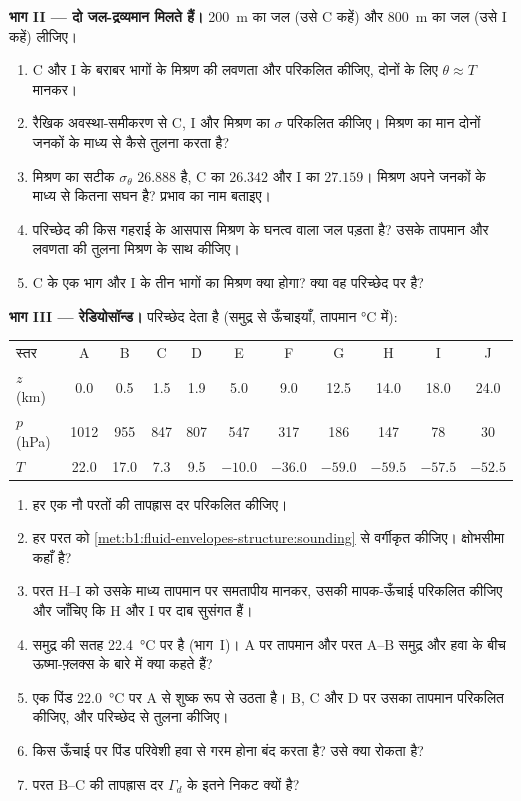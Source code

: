 \begin{problem}
\medskip
\noindent\textbf{भाग II --- दो जल-द्रव्यमान मिलते हैं।} \qty{200}{m} का जल (उसे C कहें) और \qty{800}{m} का जल (उसे I कहें) लीजिए।
\begin{enumerate}[resume]
  \item C और I के बराबर भागों के मिश्रण की लवणता और  परिकलित कीजिए, दोनों के लिए $\theta \approx T$ मानकर।
  \item रैखिक अवस्था-समीकरण से C, I और मिश्रण का $\sigma$ परिकलित कीजिए। मिश्रण का मान दोनों जनकों के माध्य से कैसे तुलना करता है?
  \item मिश्रण का सटीक $\sigma_\theta$ $26.888$ है, C का $26.342$ और I का $27.159$। मिश्रण अपने जनकों के माध्य से कितना सघन है? प्रभाव का नाम बताइए।
  \item परिच्छेद की किस गहराई के आसपास मिश्रण के घनत्व वाला जल पड़ता है? उसके तापमान और लवणता की तुलना मिश्रण के साथ कीजिए।
  \item C के एक भाग और I के तीन भागों का मिश्रण क्या होगा? क्या वह परिच्छेद पर है?
\end{enumerate}

\medskip
\noindent\textbf{भाग III --- रेडियोसॉन्ड।} परिच्छेद देता है (समुद्र से ऊँचाइयाँ, तापमान \si{\celsius} में):
\begin{center}
\small
\setlength{\tabcolsep}{4pt}
\begin{tabular}{|l|cccccccccc|}
\hline
स्तर & A & B & C & D & E & F & G & H & I & J \\
$z$ (km) & 0.0 & 0.5 & 1.5 & 1.9 & 5.0 & 9.0 & 12.5 & 14.0 & 18.0 & 24.0 \\
$p$ (hPa) & 1012 & 955 & 847 & 807 & 547 & 317 & 186 & 147 & 78 & 30 \\
$T$ & 22.0 & 17.0 & 7.3 & 9.5 & $-10.0$ & $-36.0$ & $-59.0$ & $-59.5$ & $-57.5$ & $-52.5$ \\
\hline
\end{tabular}
\end{center}
\begin{enumerate}[resume]
  \item हर एक नौ परतों की तापह्रास दर परिकलित कीजिए।
  \item हर परत को \cref{met:b1:fluid-envelopes-structure:sounding} से वर्गीकृत कीजिए। क्षोभसीमा कहाँ है?
  \item परत H--I को उसके माध्य तापमान पर समतापीय मानकर, उसकी मापक-ऊँचाई परिकलित कीजिए और जाँचिए कि H और I पर दाब सुसंगत हैं।
  \item समुद्र की सतह \qty{22.4}{\celsius} पर है (भाग~I)। A पर तापमान और परत A--B समुद्र और हवा के बीच ऊष्मा-फ़्लक्स के बारे में क्या कहते हैं?
  \item एक पिंड \qty{22.0}{\celsius} पर A से शुष्क रूप से उठता है। B, C और D पर उसका तापमान परिकलित कीजिए, और परिच्छेद से तुलना कीजिए।
  \item किस ऊँचाई पर पिंड परिवेशी हवा से गरम होना बंद करता है? उसे क्या रोकता है?
  \item परत B--C की तापह्रास दर $\Gamma_d$ के इतने निकट क्यों है?
\end{enumerate}


\end{problem}
